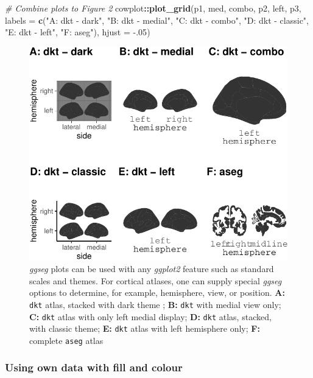 \documentclass[fleqn,10pt]{wlpeerj} %
\newenvironment{Shaded}{\begin{snugshade}}{\end{snugshade}}
\newcommand{\CommentTok}[1]{\textcolor[rgb]{0.56,0.35,0.01}{\textit{#1}}}
\newcommand{\DataTypeTok}[1]{\textcolor[rgb]{0.13,0.29,0.53}{#1}}
\newcommand{\FloatTok}[1]{\textcolor[rgb]{0.00,0.00,0.81}{#1}}
\newcommand{\KeywordTok}[1]{\textcolor[rgb]{0.13,0.29,0.53}{\textbf{#1}}}
\newcommand{\NormalTok}[1]{#1}
\newcommand{\OperatorTok}[1]{\textcolor[rgb]{0.81,0.36,0.00}{\textbf{#1}}}
\newcommand{\StringTok}[1]{\textcolor[rgb]{0.31,0.60,0.02}{#1}}
\begin{document}
\begin{Shaded}
\begin{Highlighting}[]
\CommentTok{\# Combine plots to Figure 2}
\NormalTok{cowplot}\OperatorTok{::}\KeywordTok{plot\_grid}\NormalTok{(p1, med, combo,  p2, left, p3,}
                   \DataTypeTok{labels =} \KeywordTok{c}\NormalTok{(}\StringTok{"A: dkt {-} dark"}\NormalTok{, }\StringTok{"B: dkt {-} medial"}\NormalTok{,}
                              \StringTok{"C: dkt {-} combo"}\NormalTok{, }\StringTok{"D: dkt {-} classic"}\NormalTok{,}
                              \StringTok{"E: dkt {-} left"}\NormalTok{, }\StringTok{"F: aseg"}\NormalTok{),}
                   \DataTypeTok{hjust =} \FloatTok{{-}.05}\NormalTok{)}
\end{Highlighting}
\end{Shaded}

\begin{figure}
\centering
\includegraphics{msc_ggseg_files/figure-latex/collection-1.pdf}
\caption{\label{fig:collection}\emph{ggseg} plots can be used with any \emph{ggplot2} feature such as standard scales and themes. For cortical atlases, one can supply special \emph{ggseg} options to determine, for example, hemisphere, view, or position. \textbf{A:} \texttt{dkt} atlas, stacked with dark theme ; \textbf{B:} \texttt{dkt} with medial view only; \textbf{C:} \texttt{dkt} atlas with only left medial display; \textbf{D:} \texttt{dkt} atlas, stacked, with classic theme; \textbf{E:} \texttt{dkt} atlas with left hemisphere only; \textbf{F:} complete \texttt{aseg} atlas}
\end{figure}

\hypertarget{using-own-data-with-fill-and-colour}{%
\subsubsection{Using own data with fill and colour}\label{using-own-data-with-fill-and-colour}}
\end{document}
